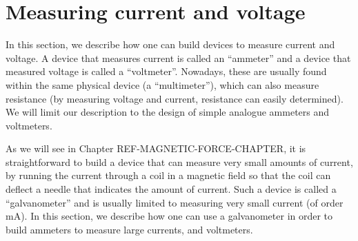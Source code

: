 \section{Measuring current and voltage}
In this section, we describe how one can build devices to measure current and voltage. A device that measures current is called an ``ammeter'' and a device that measured voltage is called a ``voltmeter''. Nowadays, these are usually found within the same physical device (a ``multimeter''), which can also measure resistance (by measuring voltage and current, resistance can easily determined). We will limit our description to the design of simple analogue ammeters and voltmeters. 

As we will see in Chapter REF-MAGNETIC-FORCE-CHAPTER, it is straightforward to build a device that can measure very small amounts of current, by running the current through a coil in a magnetic field so that the coil can deflect a needle that indicates the amount of current. Such a device is called a ``galvanometer'' and is usually limited to measuring very small current (of order \si{mA}). In this section, we describe how one can use a galvanometer in order to build ammeters to measure large currents, and voltmeters. 
